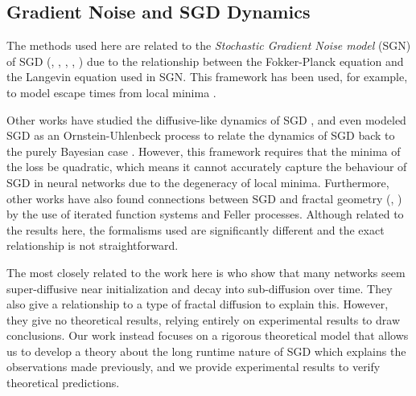\documentclass{article} %
\theoremstyle{definition}
\begin{document}
\subsection{Gradient Noise and SGD Dynamics}
The methods used here are related to the \textit{Stochastic Gradient Noise model} (SGN) of SGD (\citep{zhou2021theoreticallyunderstandingsgdgeneralizes}, \citep{battash2023revisitingnoisemodelstochastic}, \citep{nguyen2019exittimeanalysisstochastic}, \citep{simsekli2019tailindexanalysisstochasticgradient}, \citep{Mignacco_2022}) due to the relationship between the Fokker-Planck equation and the Langevin equation used in SGN. This framework has been used, for example, to model escape times from local minima \citep{xie2021diffusiontheorydeeplearning}.

 Other works have studied the diffusive-like dynamics of SGD \citep{fjellstrom2022deeplearningstochasticgradient}, and even modeled SGD as an Ornstein-Uhlenbeck process to relate the dynamics of SGD back to the purely Bayesian case \citep{mandt2016variationalanalysisstochasticgradient}. However, this framework requires that the minima of the loss be quadratic, which means it cannot accurately capture the behaviour of SGD in neural networks due to the degeneracy of local minima. Furthermore, other works have also found connections between SGD and fractal geometry (\citep{NEURIPS2021_fractalsgd}, \citep{haussdorff_heavy_tails}) by the use of iterated function systems and Feller processes. Although related to the results here, the formalisms used are significantly different and the exact relationship is not straightforward.

 The most closely related to the work here is \citep{chen2021anomalousdiffusiondynamicslearning} who show that many networks seem super-diffusive near initialization and decay into sub-diffusion over time. They also give a relationship to a type of fractal diffusion to explain this. However, they give no theoretical results, relying entirely on experimental results to draw conclusions. Our work instead focuses on a rigorous theoretical model that allows us to develop a theory about the long runtime nature of SGD which explains the observations made previously, and we provide experimental results to verify theoretical predictions.

\end{document}
